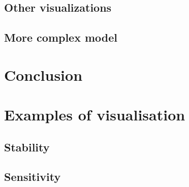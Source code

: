 \documentclass[a4paper,12pt]{report}
\begin{document}
\section{Other visualizations}
\section{More complex model}


\chapter*{Conclusion}




\appendix
{}
\chapter{Examples of visualisation}

\section{Stability}
\section{Sensitivity}

\end{document}
